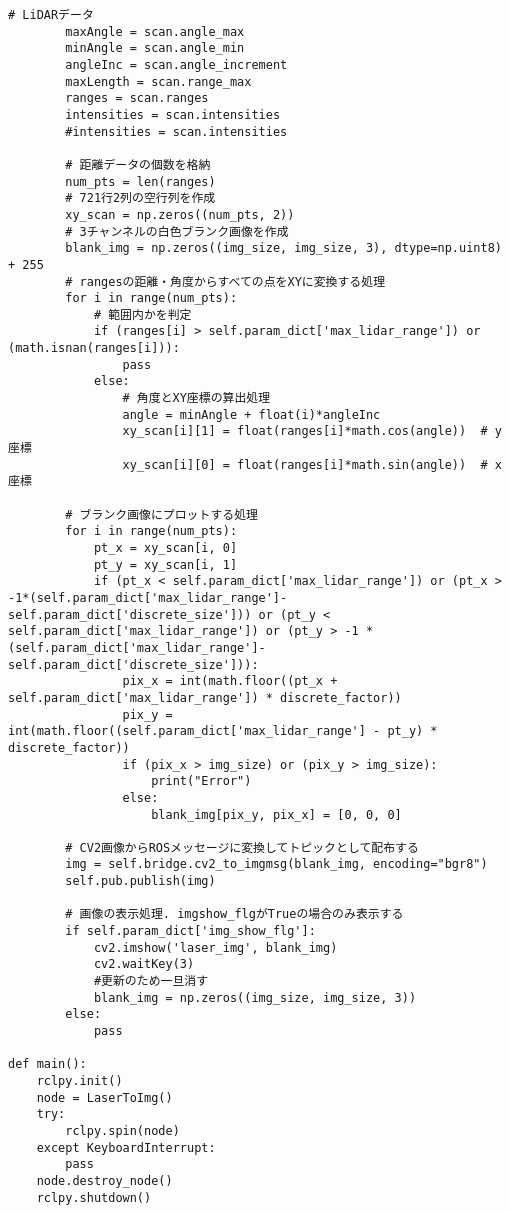 \begin{lstlisting}[caption=laser\_to\_image.py, label=image]
        # LiDARデータ
        maxAngle = scan.angle_max
        minAngle = scan.angle_min
        angleInc = scan.angle_increment
        maxLength = scan.range_max
        ranges = scan.ranges
        intensities = scan.intensities
        #intensities = scan.intensities
        
        # 距離データの個数を格納
        num_pts = len(ranges)
        # 721行2列の空行列を作成
        xy_scan = np.zeros((num_pts, 2))
        # 3チャンネルの白色ブランク画像を作成
        blank_img = np.zeros((img_size, img_size, 3), dtype=np.uint8) + 255
        # rangesの距離・角度からすべての点をXYに変換する処理
        for i in range(num_pts):
            # 範囲内かを判定
            if (ranges[i] > self.param_dict['max_lidar_range']) or (math.isnan(ranges[i])):
                pass
            else:
                # 角度とXY座標の算出処理
                angle = minAngle + float(i)*angleInc
                xy_scan[i][1] = float(ranges[i]*math.cos(angle))  # y座標
                xy_scan[i][0] = float(ranges[i]*math.sin(angle))  # x座標

        # ブランク画像にプロットする処理
        for i in range(num_pts):
            pt_x = xy_scan[i, 0]
            pt_y = xy_scan[i, 1]
            if (pt_x < self.param_dict['max_lidar_range']) or (pt_x > -1*(self.param_dict['max_lidar_range']-self.param_dict['discrete_size'])) or (pt_y < self.param_dict['max_lidar_range']) or (pt_y > -1 * (self.param_dict['max_lidar_range']-self.param_dict['discrete_size'])):
                pix_x = int(math.floor((pt_x + self.param_dict['max_lidar_range']) * discrete_factor))
                pix_y = int(math.floor((self.param_dict['max_lidar_range'] - pt_y) * discrete_factor))
                if (pix_x > img_size) or (pix_y > img_size):
                    print("Error")
                else:
                    blank_img[pix_y, pix_x] = [0, 0, 0]

        # CV2画像からROSメッセージに変換してトピックとして配布する
        img = self.bridge.cv2_to_imgmsg(blank_img, encoding="bgr8")
        self.pub.publish(img)

        # 画像の表示処理. imgshow_flgがTrueの場合のみ表示する
        if self.param_dict['img_show_flg']:
            cv2.imshow('laser_img', blank_img)
            cv2.waitKey(3)
            #更新のため一旦消す
            blank_img = np.zeros((img_size, img_size, 3))
        else:
            pass

def main():
    rclpy.init()
    node = LaserToImg()
    try:
        rclpy.spin(node)
    except KeyboardInterrupt:
        pass
    node.destroy_node()
    rclpy.shutdown()
\end{lstlisting}

